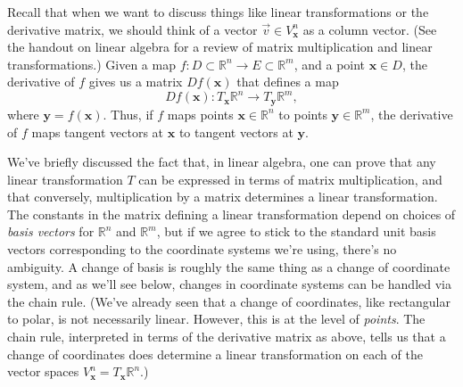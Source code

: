 \documentclass[12pt,letterpaper]{article}
\newcommand{\R}{\mathbb{R}}
\newcommand{\x}{\mathbf{x}}
\newcommand{\y}{\mathbf{y}}
\begin{document}
Recall that when we want to discuss things like linear transformations or the derivative matrix, we should think of a vector $\vec{v}\in V^n_\x$ as a column vector. (See the handout on linear algebra for a review of matrix multiplication and linear transformations.) Given a map $f:D\subset \R^n\to E\subset \R^m$, and a point $\x\in D$, the derivative of $f$ gives us a matrix $Df(\x)$ that defines a map
\[
Df(\x):T_{\x}\R^n \to T_{\y}\R^m,
\]
where $\y=f(\x)$. Thus, if $f$ maps points $\x\in\R^n$ to points $\y\in\R^m$, the derivative of $f$ maps tangent vectors at $\x$ to tangent vectors at $\y$. 

We've briefly discussed the fact that, in linear algebra, one can prove that any linear transformation $T$ can be expressed in terms of matrix multiplication, and that conversely, multiplication by a matrix determines a linear transformation. The constants in the matrix defining a linear transformation depend on choices of {\em basis vectors} for $\R^n$ and $\R^m$, but if we agree to stick to the standard unit basis vectors corresponding to the coordinate systems we're using, there's no ambiguity. A change of basis is roughly the same thing as a change of coordinate system, and as we'll see below, changes in coordinate systems can be handled via the chain rule. (We've already seen that a change of coordinates, like rectangular to polar, is not necessarily linear. However, this is at the level of {\em points}. The chain rule, interpreted in terms of the derivative matrix as above, tells us that a change of coordinates does determine a linear transformation on each of the vector spaces $V^n_{\x} = T_{\x}\R^n$.)
\end{document}
